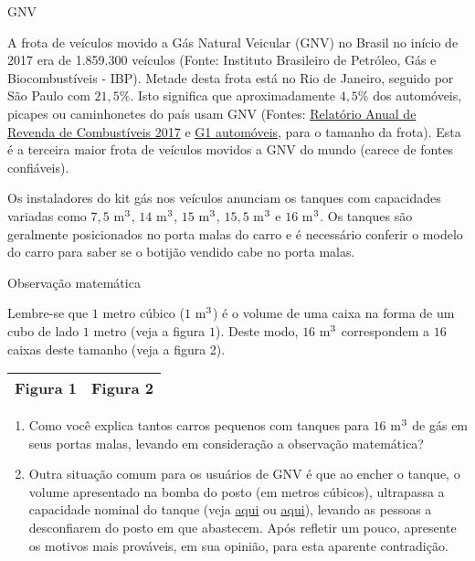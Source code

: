 \label{\detokenize{GE504-4::doc}}\label{\detokenize{GE504-4:praticando}}
\begin{task}{GNV}



A frota de veículos movido a Gás Natural Veicular (GNV) no Brasil no início de 2017 era de 1.859.300 veículos (Fonte: Instituto Brasileiro de Petróleo, Gás e Biocombustíveis - IBP). Metade desta frota está no Rio de Janeiro, seguido por São Paulo com $21{,}5\%$. Isto significa que aproximadamente $4{,}5\%$ dos automóveis, picapes ou caminhonetes do país usam GNV (Fontes: \href{http://www.fecombustiveis.org.br/relatorios/relatorio-anual-da-revenda-de-combustiveis-2017/}{Relatório Anual de Revenda de Combustíveis 2017} e \href{https://g1.globo.com/carros/noticia/frota-brasileira-de-veiculos-cresce-12-em-2017-diz-sindipecas.ghtml}{G1 automóveis}, para o tamanho da frota). Esta é a terceira maior frota de veículos movidos a GNV do mundo (carece de fontes confiáveis).

Os instaladores do kit gás nos veículos anunciam os tanques com capacidades variadas como $7{,}5$ m\(\sp{3}\), $14$ m\(\sp{3}\), $15$ m\(\sp{3}\), $15{,}5$ m\(\sp{3}\) e $16$ m\(\sp{3}\). Os tanques são geralmente posicionados no porta malas do carro e é necessário conferir o modelo do carro para saber se o botijão vendido cabe no porta malas.

\begin{observationtitle}{Observação matemática}

Lembre-se que $1$ metro cúbico ($1$ m\(\sp{3}\)) é o volume de uma caixa na forma de um cubo de lado $1$ metro (veja  a figura $1$). Deste modo, $16$ m\(\sp{3}\) correspondem a $16$ caixas deste tamanho (veja a figura 2).

\begin{table}[H]
\centering
\begin{tabular}{|c|c|}
\hline
Figura 1 & Figura 2\\
\hline
\end{tabular}
\end{table}
\end{observationtitle}

\begin{enumerate}
\item {} 
Como você explica tantos carros pequenos com tanques para $16$ m\(\sp{3}\) de gás em seus portas malas, levando em consideração a observação matemática?

\item {} 
Outra situação comum para os usuários de GNV é que ao encher o tanque, o volume apresentado na bomba do posto (em metros cúbicos), ultrapassa a capacidade nominal do tanque (veja \href{https://br.answers.yahoo.com/question/index?qid=20120927220946AAlMbWD}{aqui} ou \href{https://br.answers.yahoo.com/question/index?qid=20061006192226AAvKvOl}{aqui}), levando as pessoas a desconfiarem do posto em que abastecem. Após refletir um pouco, apresente os motivos mais prováveis, em sua opinião, para esta aparente contradição.



\end{enumerate}
\end{task}
